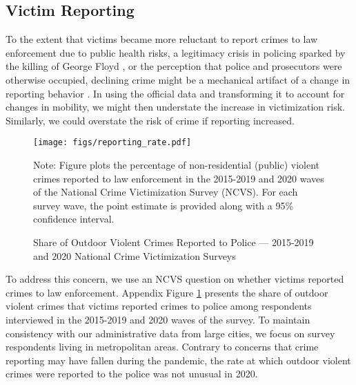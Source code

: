 \subsection{Victim Reporting} \label{sec:reporting}
To the extent that victims became more reluctant to report crimes to law enforcement due to public health risks, a legitimacy crisis in policing \citep{tyler2004enhancing, tankebe2014police, wolfe2016effect} sparked by the killing of George Floyd \citep{nix2021more}, or the perception that police and prosecutors were otherwise occupied, declining crime might be a mechanical artifact of a change in reporting behavior \citep{van1979victim, levitt1998relationship, davis2003willingness}. In using the official data and transforming it to account for changes in mobility, we might then understate the increase in victimization risk. Similarly, we could overstate the risk of crime if reporting increased.
\begin{figure}[h!]
     \begin{center}
    \caption{Share of Outdoor Violent Crimes Reported to Police --- 2015-2019 and 2020 National Crime Victimization Surveys}
    \texttt{[image: figs/reporting\_rate.pdf]}
    \label{fig:reporting_rate}
     \end{center}
        \vspace*{-8mm}  
        \newline 
Note: Figure plots the percentage of non-residential (public) violent crimes reported to law enforcement in the 2015-2019 and 2020 waves of the National Crime Victimization Survey (NCVS). For each survey wave, the point estimate is provided along with a 95\% confidence interval.
\end{figure}
To address this concern, we use an NCVS question on whether victims reported crimes to law enforcement. Appendix Figure \ref{fig:reporting_rate} presents the share of outdoor violent crimes that victims reported crimes to police among respondents interviewed in the 2015-2019 and 2020 waves of the survey. To maintain consistency with our administrative data from large cities, we focus on survey respondents living in metropolitan areas. Contrary to concerns that crime reporting may have fallen during the pandemic, the rate at which outdoor violent crimes were reported to the police was not unusual in 2020.


